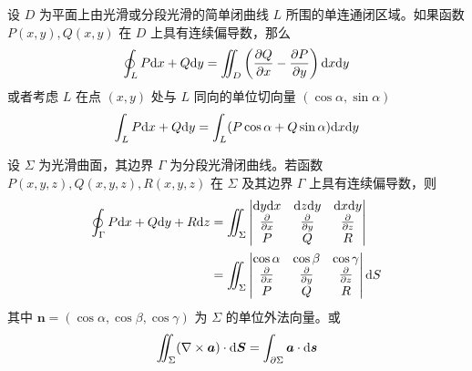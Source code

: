 \documentclass{ctexbook}
\def\diff{\textnormal{d}}
\begin{document}
\begin{theorem}[Green 公式]
    设 $D$ 为平面上由光滑或分段光滑的简单闭曲线 $L$ 所围的单连通闭区域。如果函数 $P(x,y),Q(x,y)$ 在 $D$ 上具有连续偏导数，那么
    \begin{equation}
        \oint_L P\diff x+Q\diff y=\iint_D\left(\frac{\partial Q}{\partial x}-\frac{\partial P}{\partial y}\right)\diff x\diff y
    \end{equation}
    或者考虑 $L$ 在点 $(x,y)$ 处与 $L$ 同向的单位切向量 $(\cos\alpha,\sin\alpha)$
    \begin{equation}
        \int_L P\diff x+Q\diff y=\int_L(P\cos\alpha+Q\sin\alpha)\diff x\diff y
    \end{equation}
\end{theorem}

\begin{theorem}[Stokes 公式]
    设 $\Sigma$ 为光滑曲面，其边界 $\Gamma$ 为分段光滑闭曲线。若函数 $P(x,y,z),Q(x,y,z),R(x,y,z)$ 在 $\Sigma$ 及其边界 $\Gamma$ 上具有连续偏导数，则
    \begin{align}
        \oint_\Gamma P\diff x+Q\diff y+R\diff z&=\iint_\Sigma \left|\begin{matrix}
            \diff y\diff x & \diff z\diff y & \diff x\diff y \\
            \frac{\partial}{\partial x} & \frac{\partial}{\partial y} & \frac{\partial}{\partial z} \\
            P & Q & R
        \end{matrix}\right|\\
        &=\iint_\Sigma\left|\begin{matrix}
            \cos\alpha & \cos\beta & \cos\gamma \\
            \frac{\partial}{\partial x} & \frac{\partial}{\partial y} & \frac{\partial}{\partial z} \\
            P & Q & R
        \end{matrix}\right|\diff S
    \end{align}
    其中 $\boldsymbol{n}=(\cos\alpha,\cos\beta,\cos\gamma)$ 为 $\Sigma$ 的单位外法向量。或
    \begin{equation}
        \iint_\Sigma (\nabla\times\boldsymbol{a})\cdot\diff\boldsymbol{S}=\int_{\partial \Sigma}\boldsymbol{a}\cdot\diff \boldsymbol{s}
    \end{equation}
\end{theorem}
\end{document}
